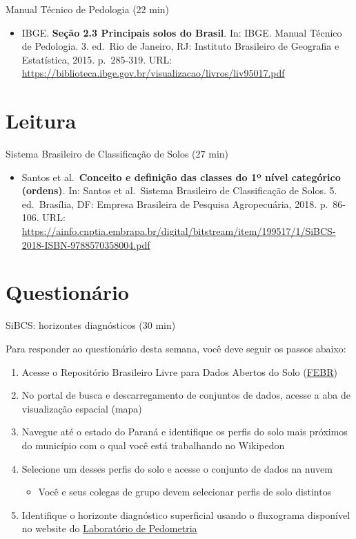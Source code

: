 \documentclass[
  11pt,
  a4paper,
  dvipsnames]{tufte-book}
\providecommand{\tightlist}{%
  \setlength{\itemsep}{0pt}\setlength{\parskip}{0pt}}
\begin{document}
Manual Técnico de Pedologia (22 min)

\begin{itemize}
\tightlist
\item
  IBGE. \textbf{Seção 2.3 Principais solos do Brasil}. In: IBGE. Manual Técnico de Pedologia. 3. ed.~Rio de Janeiro, RJ: Instituto Brasileiro de Geografia e Estatística, 2015. p.~285-319. URL: \url{https://biblioteca.ibge.gov.br/visualizacao/livros/liv95017.pdf}
\end{itemize}

\hypertarget{leitura-8}{%
\section{Leitura}\label{leitura-8}}

Sistema Brasileiro de Classificação de Solos (27 min)

\begin{itemize}
\tightlist
\item
  Santos et al.~\textbf{Conceito e definição das classes do 1º nível categórico (ordens)}. In: Santos et al.~Sistema Brasileiro de Classificação de Solos. 5. ed.~Brasília, DF: Empresa Brasileira de Pesquisa Agropecuária, 2018. p.~86-106. URL: \url{https://ainfo.cnptia.embrapa.br/digital/bitstream/item/199517/1/SiBCS-2018-ISBN-9788570358004.pdf}
\end{itemize}

\hypertarget{questionuxe1rio-7}{%
\section{Questionário}\label{questionuxe1rio-7}}

SiBCS: horizontes diagnósticos (30 min)

Para responder ao questionário desta semana, você deve seguir os passos abaixo:

\begin{enumerate}
\def\labelenumi{\arabic{enumi}.}
\tightlist
\item
  Acesse o Repositório Brasileiro Livre para Dados Abertos do Solo (\href{https://www.pedometria.org/projeto/febr/}{FEBR})
\item
  No portal de busca e descarregamento de conjuntos de dados, acesse a aba de visualização espacial (mapa)
\item
  Navegue até o estado do Paraná e identifique os perfis do solo mais próximos do município com o qual você está trabalhando no Wikipedon
\item
  Selecione um desses perfis do solo e acesse o conjunto de dados na nuvem

  \begin{itemize}
  \tightlist
  \item
    Você e seus colegas de grupo devem selecionar perfis de solo distintos
  \end{itemize}
\item
  Identifique o horizonte diagnóstico superficial usando o fluxograma disponível no website do \href{https://www.pedometria.org/cursos/classificacao-de-solos/horizonte-diagnostico-superficial/}{Laboratório de Pedometria}
\end{enumerate}
\end{document}
